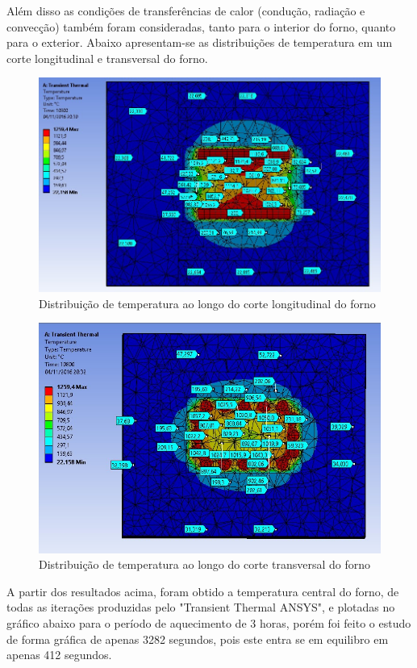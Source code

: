Além disso as condições de transferências de calor (condução, radiação e convecção)
também foram consideradas, tanto para o interior do forno, quanto para o exterior. Abaixo
apresentam-se as distribuições de temperatura em um corte longitudinal e transversal do forno.
\begin{figure}[ht]
	\centering
	\label{ansys16}
	\includegraphics[keepaspectratio=true,scale=0.8]{figuras/ansys15.jpg}
    \caption{Distribuição de temperatura ao longo do corte longitudinal do forno}
\end{figure}
\begin{figure}[ht]
	\centering
	\label{ansys16}
	\includegraphics[keepaspectratio=true,scale=0.8]{figuras/ansys16.jpg}
    \caption{Distribuição de temperatura ao longo do corte transversal do forno}
\end{figure}

A partir dos resultados acima, foram obtido a temperatura central do forno, de todas as
iterações produzidas pelo "Transient Thermal ANSYS", e plotadas no gráfico abaixo para o período
de aquecimento de 3 horas, porém foi feito o estudo de forma gráfica de apenas 3282 segundos,
pois este entra se em equilibro em apenas 412 segundos.

